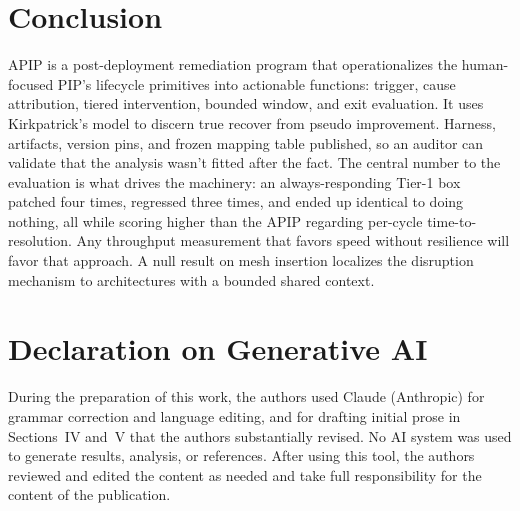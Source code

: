 \documentclass[conference]{IEEEtran}
\begin{document}
\section{Conclusion}

APIP is a post-deployment remediation program that operationalizes the human-focused PIP's lifecycle
primitives into actionable functions: trigger, cause attribution, tiered intervention, bounded window, 
and exit evaluation. It uses Kirkpatrick's model to discern true recover from pseudo improvement. 
Harness, artifacts, version pins, and frozen mapping table published, so an auditor can validate 
that the analysis wasn't fitted after the fact. The central number to the evaluation  
is what drives the machinery: an always-responding Tier-1 box patched four times,  
regressed three times, and ended up identical to doing nothing, all while scoring 
higher than the APIP regarding per-cycle time-to-resolution.  Any throughput  
measurement that favors speed without resilience will favor that approach. 
A null result on mesh insertion localizes the disruption mechanism to architectures with a bounded shared context.


\section*{Declaration on Generative AI}

During the preparation of this work, the authors used Claude (Anthropic) for
grammar correction and language editing, and for drafting initial prose in
Sections~IV and~V that the authors substantially revised. No AI
system was used to generate results, analysis, or references. After using this
tool, the authors reviewed and edited the content as needed and take full
responsibility for the content of the publication.
\end{document}
